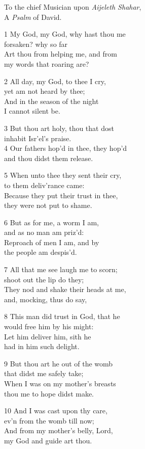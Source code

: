 \begin{multicols}{3}
To the chief Musician upon \emph{Aijeleth Shahar},\\
A \emph{Psalm} of David.

1 My God, my God, why hast thou me\\
forsaken? why so far\\
Art thou from helping me, and from\\
my words that roaring are?

2 All day, my God, to thee I cry,\\
yet am not heard by thee;\\
And in the season of the night\\
I cannot silent be.

3 But thou art holy, thou that dost\\
inhabit Isr’el’s praise.\\
4 Our fathers hop’d in thee, they hop’d\\
and thou didst them release.

5 When unto thee they sent their cry,\\
to them deliv’rance came:\\
Because they put their trust in thee,\\
they were not put to shame.

6 But as for me, a worm I am,\\
and as no man am priz’d:\\
Reproach of men I am, and by\\
the people am despis’d.

7 All that me see laugh me to scorn;\\
shoot out the lip do they;\\
They nod and shake their heads at me,\\
and, mocking, thus do say,

8 This man did trust in God, that he\\
would free him by his might:\\
Let him deliver him, sith he\\
had in him such delight.

9 But thou art he out of the womb\\
that didst me safely take;\\
When I was on my mother’s breasts\\
thou me to hope didst make.

10 And I was cast upon thy care,\\
ev’n from the womb till now;\\
And from my mother’s belly, Lord,\\
my God and guide art thou.


\end{multicols}

